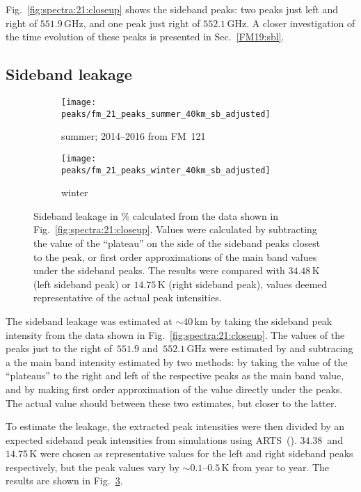 Fig.~\ref{fig:spectra:21:closeup} shows the sideband peaks:  two peaks just
left and right of $551.9\,\mathrm{GHz}$, and one peak just right of
$552.1\,\mathrm{GHz}$.  A closer investigation of the time evolution of these
peaks is presented in Sec.~\ref{FM19:sbl}.


\subsection{Sideband leakage}
\label{FM21:sbl}

\begin{figure}[ht]
    \centering
    \begin{subfigure}[b]{0.9545\textwidth}
        \texttt{[image: peaks/fm\_21\_peaks\_summer\_40km\_sb\_adjusted]}
        \caption{summer; 2014--2016 from FM~121
            }\label{fig:sbl:21:summer}
    \end{subfigure}
    \begin{subfigure}[b]{0.9545\textwidth}
        \texttt{[image: peaks/fm\_21\_peaks\_winter\_40km\_sb\_adjusted]}
        \caption{winter}\label{fig:sbl:21:winter}
    \end{subfigure}
    \caption{Sideband leakage in \% calculated from the data shown in
        Fig.~\ref{fig:spectra:21:closeup}.  Values were calculated by
        subtracting the value of the ``plateau'' on the side of the sideband
        peaks closest to the  peak, or first order
        approximations of the main band values under the sideband peaks.  The
        results were compared with $34.48\,\mathrm{K}$ (left sideband peak) or
        $14.75\,\mathrm{K}$ (right sideband peak), values deemed
        representative of the actual peak intensities.
        }\label{fig:sbl:21}
\end{figure}

\noindent
The sideband leakage was estimated at $\sim40\,\mathrm{km}$ by taking the
sideband peak intensity from the data shown in
Fig.~\ref{fig:spectra:21:closeup}. The values of the peaks just to the right
of~$551.9$ and~$552.1\,\mathrm{GHz}$ were estimated by and subtracing a the
main band intensity estimated by two methods:  by taking the value of the
``plateaus'' to the right and left of the respective peaks as the main band
value, and by making first order approximation of the value directly under the
peaks.  The actual value should between these two estimates, but closer to the
latter.

To estimate the leakage, the extracted peak intensities were then
divided by an expected sideband peak intensities from simulations using
ARTS~(\cite{buehler:artst:05}).  $34.38$~and $14.75\,\mathrm{K}$ were chosen as
representative values for the left and right sideband peaks respectively, but
the peak values vary by $\sim0.1$--$0.5\,\mathrm{K}$ from year to year.  The
results are shown in Fig.~\ref{fig:sbl:21}.

